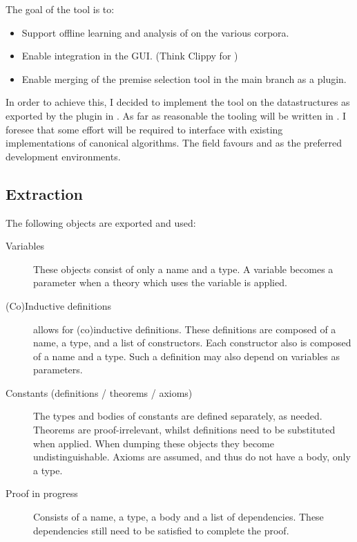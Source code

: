 The goal of the \premiseselection tool is to:
\begin{itemize}
    \item Support offline learning and analysis of \machinelearning on the various corpora.
    \item Enable integration in the \coqide GUI. (Think Clippy for \coq)
    \item Enable merging of the premise selection tool in the \coq main branch as a plugin.
\end{itemize}
In order to achieve this, I decided to implement the tool on the \acic datastructures
as exported by the \xml plugin in \coq.
As far as reasonable the \premiseselection tooling will be written in \ocaml.
I foresee that some effort will be required to interface \ocaml with existing implementations
of canonical \machinelearning algorithms.
The \machinelearning field favours \python and \matlab as the preferred development environments.



\subsection{Extraction}
The following \coq objects are exported and used:
\begin{description}
    \item[Variables]
        These objects consist of only a name and a type.
        A variable becomes a parameter when a theory which uses the variable is applied.
    
    \item[(Co)Inductive definitions]
        \coq allows for (co)inductive definitions.
        These definitions are composed of a name, a type, and a list of constructors.
        Each constructor also is composed of a name and a type.
        Such a definition may also depend on variables as parameters.

    \item[Constants (definitions / theorems / axioms)]
        The types and bodies of constants are defined separately, as needed.
        Theorems are proof-irrelevant, whilst definitions need to be substituted when applied.
        When dumping these objects they become undistinguishable.
        Axioms are assumed, and thus do not have a body, only a type.
    
    \item[Proof in progress]
        Consists of a name, a type, a body and a list of dependencies.
        These dependencies still need to be satisfied to complete the proof.
\end{description}

